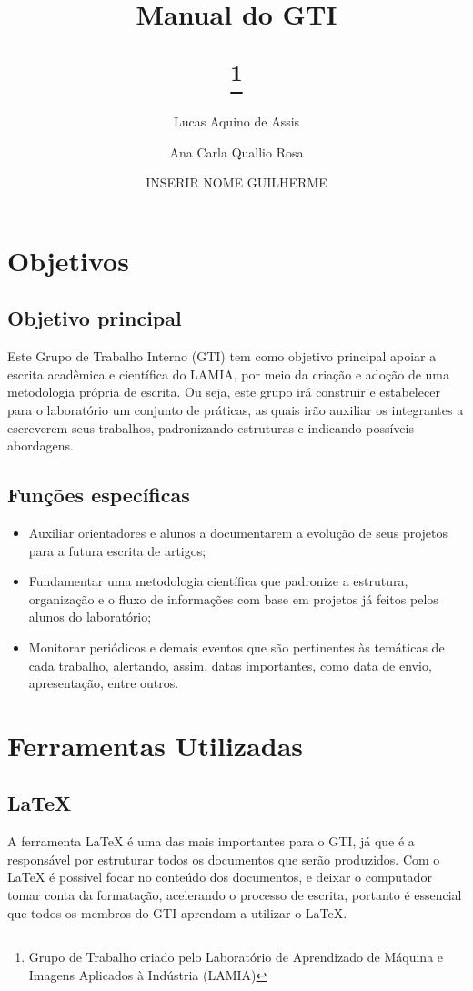 \documentclass{article}
\title{Manual do GTI
	\author{
		Lucas Aquino de Assis
		\and
		Ana Carla Quallio Rosa
		\and
		INSERIR NOME GUILHERME
	}
	\thanks{Grupo de Trabalho criado pelo Laboratório de Aprendizado de Máquina e Imagens Aplicados à Indústria (LAMIA)}
}
\begin{document}
\begin{titlepage}
\maketitle
\end{titlepage}

\tableofcontents

\section{Objetivos}
\subsection{Objetivo principal}
Este Grupo de Trabalho Interno (GTI) tem como objetivo principal apoiar a escrita acadêmica e científica do LAMIA, por meio da criação e adoção de uma metodologia própria de escrita. Ou seja, este grupo irá construir e estabelecer para o laboratório um conjunto de práticas, as quais irão auxiliar os integrantes a escreverem seus trabalhos, padronizando estruturas e indicando possíveis abordagens. 

\subsection{Funções específicas}
\begin{itemize}
  \item Auxiliar orientadores e alunos a documentarem a evolução de seus projetos para a futura escrita de artigos;
  \item Fundamentar uma metodologia científica que padronize a estrutura, organização e o fluxo de informações com base em projetos já feitos pelos alunos do laboratório;
  \item Monitorar periódicos e demais eventos que são pertinentes às temáticas de cada trabalho, alertando, assim, datas importantes, como data de envio, apresentação, entre outros.
\end{itemize}

\section{Ferramentas Utilizadas}
\subsection{LaTeX}
A ferramenta LaTeX é uma das mais importantes para o GTI, já que é a responsável por estruturar todos os documentos que serão produzidos. Com o LaTeX é possível focar no conteúdo dos documentos, e deixar o computador tomar conta da formatação, acelerando o processo de escrita, portanto é essencial que todos os membros do GTI aprendam a utilizar o LaTeX.
\end{document}
